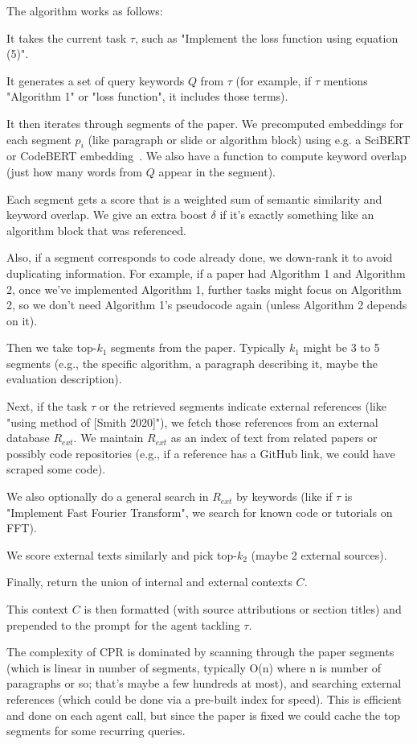 \documentclass{ieeeaccess}
\begin{document}
The algorithm works as follows:

It takes the current task $\tau$, such as "Implement the loss function using equation (5)".

It generates a set of query keywords $Q$ from $\tau$ (for example, if $\tau$ mentions "Algorithm 1" or "loss function", it includes those terms).

It then iterates through segments of the paper. We precomputed embeddings for each segment $p_i$ (like paragraph or slide or algorithm block) using e.g. a SciBERT or CodeBERT embedding~\cite{feng2020codebert}. We also have a function to compute keyword overlap (just how many words from $Q$ appear in the segment).

Each segment gets a score that is a weighted sum of semantic similarity and keyword overlap. We give an extra boost $\delta$ if it's exactly something like an algorithm block that was referenced.

Also, if a segment corresponds to code already done, we down-rank it to avoid duplicating information. For example, if a paper had Algorithm 1 and Algorithm 2, once we've implemented Algorithm 1, further tasks might focus on Algorithm 2, so we don't need Algorithm 1's pseudocode again (unless Algorithm 2 depends on it).

Then we take top-$k_1$ segments from the paper. Typically $k_1$ might be 3 to 5 segments (e.g., the specific algorithm, a paragraph describing it, maybe the evaluation description).

Next, if the task $\tau$ or the retrieved segments indicate external references (like "using method of [Smith 2020]"), we fetch those references from an external database $R_{ext}$. We maintain $R_{ext}$ as an index of text from related papers or possibly code repositories (e.g., if a reference has a GitHub link, we could have scraped some code).

We also optionally do a general search in $R_{ext}$ by keywords (like if $\tau$ is "Implement Fast Fourier Transform", we search for known code or tutorials on FFT).

We score external texts similarly and pick top-$k_2$ (maybe 2 external sources).

Finally, return the union of internal and external contexts $C$.

This context $C$ is then formatted (with source attributions or section titles) and prepended to the prompt for the agent tackling $\tau$.

The complexity of CPR is dominated by scanning through the paper segments (which is linear in number of segments, typically O(n) where n is number of paragraphs or so; that's maybe a few hundreds at most), and searching external references (which could be done via a pre-built index for speed). This is efficient and done on each agent call, but since the paper is fixed we could cache the top segments for some recurring queries.
\end{document}
